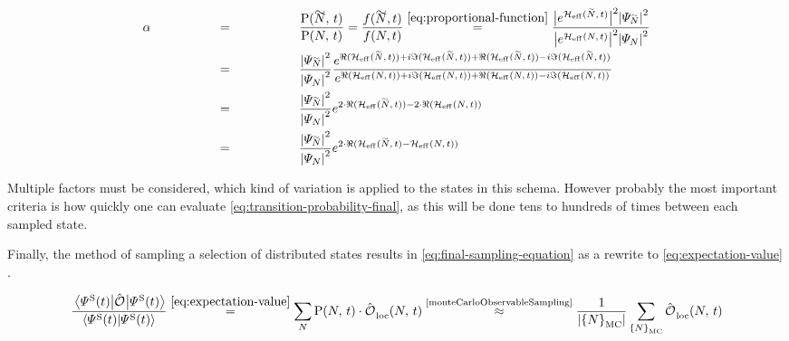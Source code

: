 \begin{equation}
    \label{eq:transition-probability-final}
    \begin{split}
        \alpha &\stackrel{\phantom{\ref{eq:proportional-function}}}{=} \frac{\probabilityOf{\vphantom{N}\smash{\tilde{N}}}{t}}{\probabilityOf{N}{t}} =  \frac{f(\vphantom{N}\smash{\tilde{N}},t)}{f(N,t)}
        \stackrel{\ref{eq:proportional-function}}{=}
        \frac{
            \absSquare{e^{\HeffOft[\vphantom{N}\smash{\tilde{N}}]}} \absSquare{\psiN[\vphantom{N}\smash{\tilde{N}}]}
        }{
            \absSquare{e^{\HeffOft}} \absSquare{\psiN}
        }\\
        &\stackrel{\phantom{\ref{eq:proportional-function}}}{=}
        \frac{\absSquare{\psiN[\vphantom{N}\smash{\tilde{N}}]}}{\absSquare{\psiN}}
        \frac{
            e^{\real\left(\HeffOft[\vphantom{N}\smash{\tilde{N}}]\right) + i\imaginary\left(\HeffOft[\vphantom{N}\smash{\tilde{N}}]\right) +\real\left(\HeffOft[\vphantom{N}\smash{\tilde{N}}]\right)-i \imaginary\left(\HeffOft[\vphantom{N}\smash{\tilde{N}}]\right)}
        }{
            e^{\real\left(\HeffOft\right) + i\imaginary\left(\HeffOft\right) +\real\left(\HeffOft\right)-i \imaginary\left(\HeffOft\right)}
        }\\
        &\stackrel{\phantom{\ref{eq:proportional-function}}}{=}
        \frac{\absSquare{\psiN[\vphantom{N}\smash{\tilde{N}}]}}{\absSquare{\psiN}}
        e^{2\cdot \real\left(\HeffOft[\vphantom{N}\smash{\tilde{N}}]\right) - 2\cdot \real\left(\HeffOft\right)}\\
        &\stackrel{\phantom{\ref{eq:proportional-function}}}{=}
        \frac{\absSquare{\psiN[\vphantom{N}\smash{\tilde{N}}]}}{\absSquare{\psiN}}
        e^{2\cdot \real\left(\HeffOft[\vphantom{N}\smash{\tilde{N}}] - \HeffOft\right)}
    \end{split}
\end{equation}

Multiple factors must be considered, which kind of variation is applied to the states in this schema. 
However probably the most important criteria is how quickly one can evaluate \autoref{eq:transition-probability-final}, as this will be done tens to hundreds of times between each sampled state.

Finally, the method of sampling a selection of distributed states results in \autoref{eq:final-sampling-equation} as a rewrite to \autoref{eq:expectation-value} \cite{monteCarloObservableSampling}.

\begin{equation}
    \label{eq:final-sampling-equation}
    \frac{\bracketHelper{\psiOfT[\schroedingerPicture]}{\ObservableOp}{\psiOfT[\schroedingerPicture]}}{\braketHelper{\psiOfT[\schroedingerPicture]}{\psiOfT[\schroedingerPicture]}} \stackrel{\ref{eq:expectation-value}}{=} 
    \lsum[N]
    \probabilityOf{N}{t} \cdot
    \localObservable{N}{t}
    \stackrel{\text{\cite{monteCarloObservableSampling}}}{\approx} \frac{1}{\left|\left\{N\right\}_\text{MC}\right|} \lsum[\left\{N\right\}_\text{MC}]\localObservable{N}{t}
\end{equation}